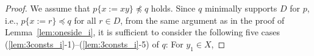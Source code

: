 \begin{proof}
We assume that $p \{ x := xy \} \not\preceq q$ holds. 
%
%
%
%
{\color{red} Since $q$ minimally supports $D$ for $p$, i.e., $p\{x:=r\}\preceq q$ for all $r\in D$, }
from the same argument as in the proof of Lemma~\ref{lem:oneside_i}, it is sufficient to consider the following five cases (\ref{lem:3consts_i}-1)--(\ref{lem:3consts_i}-5) of $q$: For $y_{1} \in X$,


\end{proof}
